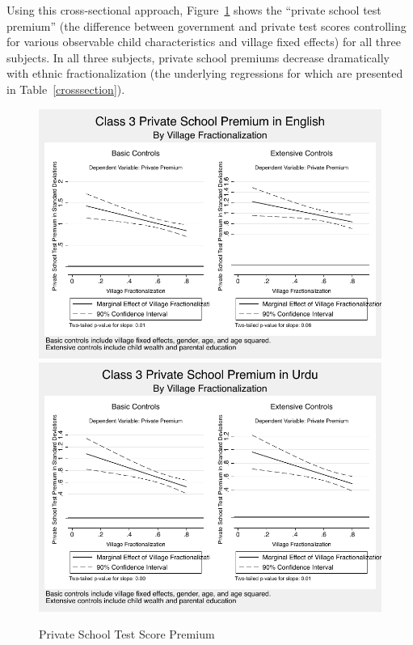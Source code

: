 \documentclass[12pt]{article}
\begin{document}
Using this cross-sectional approach, Figure~\ref{crosssectiongraphs} shows the ``private school test premium'' (the difference between government and private test scores controlling for various observable child characteristics and village fixed effects) for all three subjects. In all three subjects, private school premiums decrease dramatically with ethnic fractionalization (the underlying regressions for which are presented in Table~\ref{crosssection}).

\begin{figure}[htb]
	\caption{Private School Test Score Premium}\label{crosssectiongraphs}
	\centering	
	\includegraphics[scale=0.8]{graphs/privatepremium_english_crosssection.pdf}
	\includegraphics[scale=0.8]{graphs/privatepremium_urdu_crosssection.pdf}

\end{figure}
\end{document}
